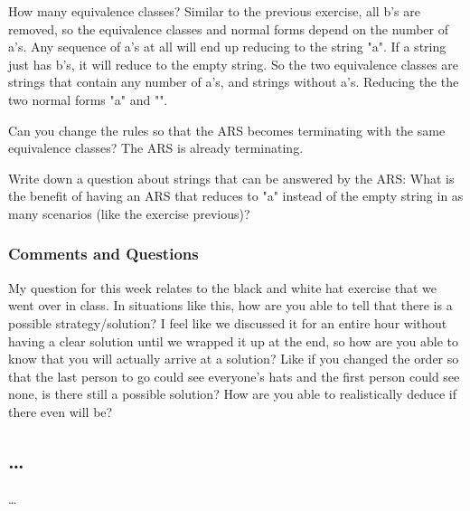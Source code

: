 \documentclass{article}
\theoremstyle{theorem}
\theoremstyle{definition}
\theoremstyle{remark}
\begin{document}
How many equivalence classes?
Similar to the previous exercise, all b's are removed, so the equivalence 
classes and normal forms depend on the number of a's. Any sequence of a's at all will 
end up reducing to the string "a". If a string just has b's, it will reduce to the 
empty string. So the two equivalence classes are strings that contain any number of 
a's, and strings without a's. Reducing the the two normal forms "a" and "".

Can you change the rules so that the ARS becomes terminating with 
the same equivalence classes?
The ARS is already terminating.

Write down a question about strings that can be answered by the ARS:
What is the benefit of having an ARS that reduces to "a" instead of the empty 
string in as many scenarios (like the exercise previous)? 
\subsubsection*{Comments and Questions}
My question for this week relates to the black and white hat exercise that we 
went over in class. In situations like this, how are you able to tell that there is a 
possible strategy/solution? I feel like we discussed it for an entire hour without having a clear
solution until we wrapped it up at the end, so how are you able to know that you will actually 
arrive at a solution? Like if you changed the order so that the last person to go could see 
everyone's hats and the first person could see none, is there still a possible solution? How 
are you able to realistically deduce if there even will be? 
\subsection{\ldots}
\ldots



\end{document}
